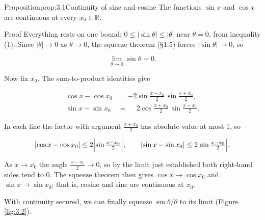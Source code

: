 \documentclass[a4paper,12pt,oneside]{memoir}
\begin{document}
\begin{envproposition}{Proposition}{prop:3.1}{Continuity of sine and cosine}
The functions \(\sin x\) and \(\cos x\) are continuous at every \(x_{0} \in \mathbb{R}\).
\end{envproposition}
\begin{envproof}{Proof}{}{}
Everything rests on one bound: \(0 \le \lvert \sin\theta \rvert \le \lvert \theta \rvert\) near \(\theta = 0\), from inequality (1). Since \(\lvert \theta \rvert \to 0\) as \(\theta \to 0\), the squeeze theorem (§1.5) forces \(\lvert \sin\theta \rvert \to 0\), so

\[ \lim_{\theta \to 0} \sin\theta = 0. \]

Now fix \(x_{0}\). The sum-to-product identities give

\[ \begin{aligned}
        \cos x - \cos x_{0} &= -2 \sin\frac{x - x_{0}}{2}\, \sin\frac{x + x_{0}}{2}, \\
        \sin x - \sin x_{0} &= \phantom{-}2 \cos\frac{x + x_{0}}{2}\, \sin\frac{x - x_{0}}{2}.
      \end{aligned} \]

In each line the factor with argument \(\tfrac{x + x_{0}}{2}\) has absolute value at most \(1\), so

\[ \lvert \cos x - \cos x_{0} \rvert \le 2\Bigl\lvert \sin\tfrac{x - x_{0}}{2} \Bigr\rvert, \qquad \lvert \sin x - \sin x_{0} \rvert \le 2\Bigl\lvert \sin\tfrac{x - x_{0}}{2} \Bigr\rvert. \]

As \(x \to x_{0}\) the angle \(\tfrac{x - x_{0}}{2} \to 0\), so by the limit just established both right-hand sides tend to \(0\). The squeeze theorem then gives \(\cos x \to \cos x_{0}\) and \(\sin x \to \sin x_{0}\); that is, cosine and sine are continuous at \(x_{0}\).
\end{envproof}
With continuity secured, we can finally squeeze \(\sin\theta/\theta\) to its limit (Figure \ref{fig:3.2}).
\end{document}
